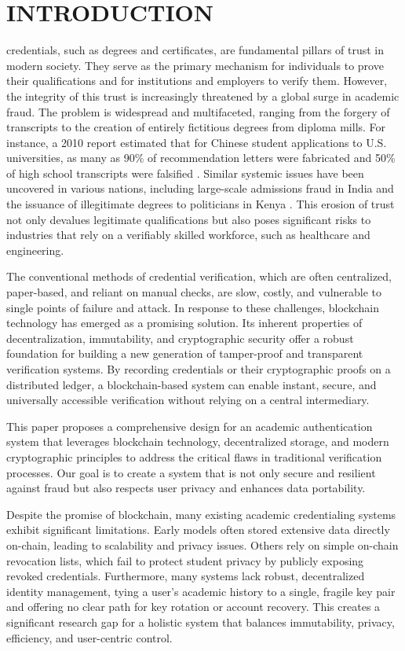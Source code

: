 \documentclass[lettersize,journal]{IEEEtran}
\begin{document}
\section{INTRODUCTION}
 credentials, such as degrees and certificates, are fundamental pillars of trust in modern society. They serve as the primary mechanism for individuals to prove their qualifications and for institutions and employers to verify them. However, the integrity of this trust is increasingly threatened by a global surge in academic fraud. The problem is widespread and multifaceted, ranging from the forgery of transcripts to the creation of entirely fictitious degrees from diploma mills. For instance, a 2010 report estimated that for Chinese student applications to U.S. universities, as many as 90\% of recommendation letters were fabricated and 50\% of high school transcripts were falsified \cite{WES2017Fraud}. Similar systemic issues have been uncovered in various nations, including large-scale admissions fraud in India and the issuance of illegitimate degrees to politicians in Kenya \cite{WES2017Fraud}. This erosion of trust not only devalues legitimate qualifications but also poses significant risks to industries that rely on a verifiably skilled workforce, such as healthcare and engineering.

The conventional methods of credential verification, which are often centralized, paper-based, and reliant on manual checks, are slow, costly, and vulnerable to single points of failure and attack. In response to these challenges, blockchain technology has emerged as a promising solution. Its inherent properties of decentralization, immutability, and cryptographic security offer a robust foundation for building a new generation of tamper-proof and transparent verification systems. By recording credentials or their cryptographic proofs on a distributed ledger, a blockchain-based system can enable instant, secure, and universally accessible verification without relying on a central intermediary.

This paper proposes a comprehensive design for an academic authentication system that leverages blockchain technology, decentralized storage, and modern cryptographic principles to address the critical flaws in traditional verification processes. Our goal is to create a system that is not only secure and resilient against fraud but also respects user privacy and enhances data portability.

Despite the promise of blockchain, many existing academic credentialing systems exhibit significant limitations. Early models often stored extensive data directly on-chain, leading to scalability and privacy issues. Others rely on simple on-chain revocation lists, which fail to protect student privacy by publicly exposing revoked credentials. Furthermore, many systems lack robust, decentralized identity management, tying a user's academic history to a single, fragile key pair and offering no clear path for key rotation or account recovery. This creates a significant research gap for a holistic system that balances immutability, privacy, efficiency, and user-centric control.
\end{document}
